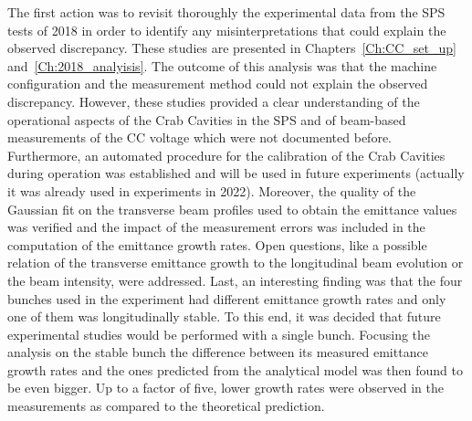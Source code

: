 The first action was to revisit thoroughly the experimental data from the SPS tests of 2018 in order to identify any misinterpretations that could explain the observed discrepancy. These studies are presented in Chapters~\ref{Ch:CC_set_up} and~\ref{Ch:2018_analyisis}. The outcome of this analysis was that the machine configuration and the measurement method could not explain the observed discrepancy. However, these studies provided a clear understanding of the operational aspects of the Crab Cavities in the SPS and of beam-based measurements of the CC voltage which were not documented before. Furthermore, an automated procedure for the calibration of the Crab Cavities during operation was established and will be used in future experiments (actually it was already used in experiments in 2022). Moreover, the quality of the  Gaussian fit on the transverse beam profiles used to obtain the emittance values was verified and the impact of the measurement errors was included in the computation of the emittance growth rates. Open questions, like a possible relation of the transverse emittance growth to the longitudinal beam evolution or the beam intensity, were addressed. Last, an interesting finding was that the four bunches used in the experiment had different emittance growth rates and only one of them was longitudinally stable. To this end, it was decided that future experimental studies would be performed with a single bunch. Focusing the analysis on the stable bunch the difference between its measured emittance growth rates and the ones predicted from the analytical model was then found to be even bigger. Up to a factor of five, lower growth rates were observed in the measurements as compared to the theoretical prediction. 

